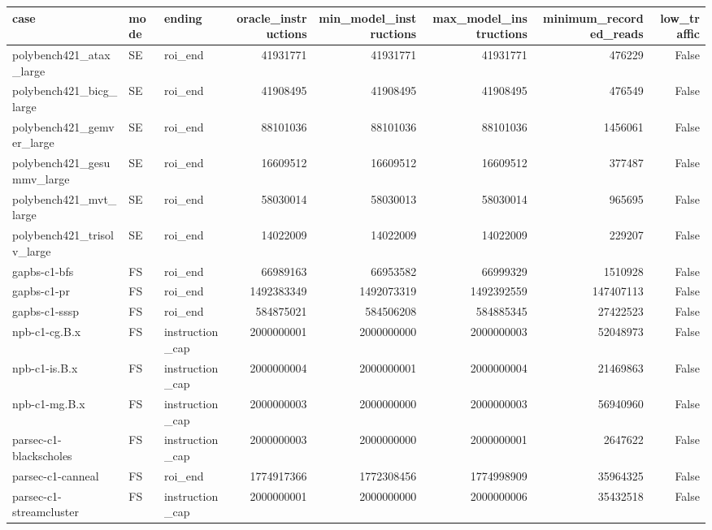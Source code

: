 \begin{tabular}{lllrrrrr}
\toprule
case & mode & ending & oracle\_instructions & min\_model\_instructions & max\_model\_instructions & minimum\_recorded\_reads & low\_traffic \\
\midrule
polybench421\_atax\_large & SE & roi\_end & 41931771 & 41931771 & 41931771 & 476229 & False \\
polybench421\_bicg\_large & SE & roi\_end & 41908495 & 41908495 & 41908495 & 476549 & False \\
polybench421\_gemver\_large & SE & roi\_end & 88101036 & 88101036 & 88101036 & 1456061 & False \\
polybench421\_gesummv\_large & SE & roi\_end & 16609512 & 16609512 & 16609512 & 377487 & False \\
polybench421\_mvt\_large & SE & roi\_end & 58030014 & 58030013 & 58030014 & 965695 & False \\
polybench421\_trisolv\_large & SE & roi\_end & 14022009 & 14022009 & 14022009 & 229207 & False \\
gapbs-c1-bfs & FS & roi\_end & 66989163 & 66953582 & 66999329 & 1510928 & False \\
gapbs-c1-pr & FS & roi\_end & 1492383349 & 1492073319 & 1492392559 & 147407113 & False \\
gapbs-c1-sssp & FS & roi\_end & 584875021 & 584506208 & 584885345 & 27422523 & False \\
npb-c1-cg.B.x & FS & instruction\_cap & 2000000001 & 2000000000 & 2000000003 & 52048973 & False \\
npb-c1-is.B.x & FS & instruction\_cap & 2000000004 & 2000000001 & 2000000004 & 21469863 & False \\
npb-c1-mg.B.x & FS & instruction\_cap & 2000000003 & 2000000000 & 2000000003 & 56940960 & False \\
parsec-c1-blackscholes & FS & instruction\_cap & 2000000003 & 2000000000 & 2000000001 & 2647622 & False \\
parsec-c1-canneal & FS & roi\_end & 1774917366 & 1772308456 & 1774998909 & 35964325 & False \\
parsec-c1-streamcluster & FS & instruction\_cap & 2000000001 & 2000000000 & 2000000006 & 35432518 & False \\
\bottomrule
\end{tabular}
